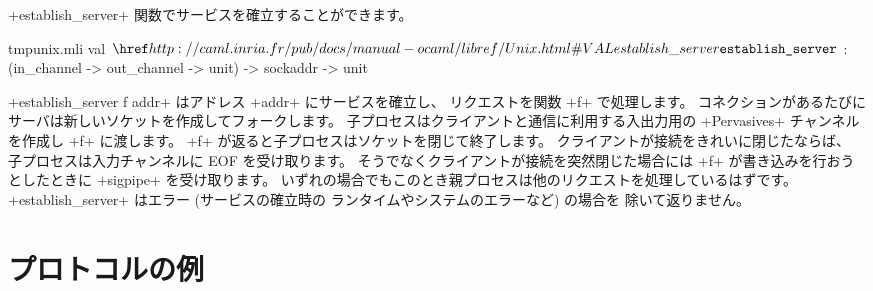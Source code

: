 \ml+establish_server+ 関数でサービスを確立することができます。
%
\begin{listingcodefile}{tmpunix.mli}
val $\indexlibvalue{Unix}{establish\_server}$ :
  (in_channel -> out_channel -> unit) -> sockaddr -> unit
\end{listingcodefile}
%
\ml+establish_server f addr+ はアドレス \ml+addr+ にサービスを確立し、
リクエストを関数 \ml+f+ で処理します。
コネクションがあるたびにサーバは新しいソケットを作成してフォークします。
子プロセスはクライアントと通信に利用する入出力用の \ml+Pervasives+ チャンネルを作成し \ml+f+
に渡します。
\ml+f+ が返ると子プロセスはソケットを閉じて終了します。
クライアントが接続をきれいに閉じたならば、
子プロセスは入力チャンネルに EOF を受け取ります。
そうでなくクライアントが接続を突然閉じた場合には \ml+f+ が書き込みを行おうとしたときに
\ml+sigpipe+ を受け取ります。
いずれの場合でもこのとき親プロセスは他のリクエストを処理しているはずです。
\ml+establish_server+ はエラー (サービスの確立時の \ocaml ランタイムやシステムのエラーなど) の場合を
除いて返りません。


\section{プロトコルの例}


